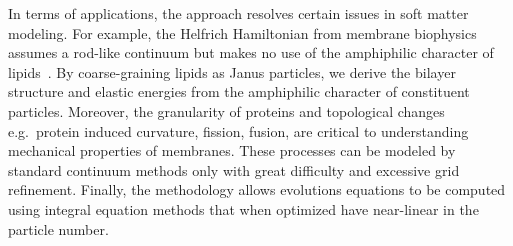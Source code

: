 In terms of applications, the approach  resolves
certain issues in soft matter modeling. For example, the Helfrich
Hamiltonian from membrane biophysics assumes a rod-like continuum but
makes no use of the amphiphilic character of lipids~\cite{Hamm2000,
TerziDeserno17, PhysRevE.102.042406}. By coarse-graining lipids as Janus
particles, we derive the bilayer structure and elastic energies from the
amphiphilic character of constituent particles. Moreover, the
granularity of proteins and topological changes e.g.~protein induced
curvature, fission, fusion, are critical to understanding mechanical
properties of membranes. These processes can be modeled by standard
continuum methods only with great difficulty and excessive grid
refinement.
Finally, the methodology allows evolutions equations to be computed
using integral equation methods that when optimized have near-linear in
the particle number. 

